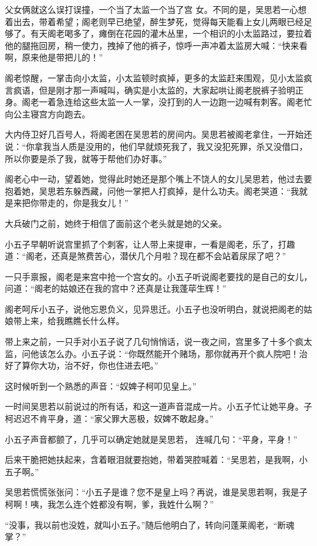 父女俩就这么误打误撞，一个当了太监一个当了宫
女。不同的是，吴思若一心想着出去，带着希望；阁老则早已绝望，醉生梦死，觉得每天能看上女儿两眼已经足够了。有天阁老喝多了，瘫倒在花园的灌木丛里，一个相识的小太监路过，要拉着他的腿拖回房，稍一使力，拽掉了他的裤子，惊呼一声冲着太监房大喊：“快来看啊，原来他是带把儿的！”

阁老惊醒，一掌击向小太监，小太监顿时疯掉，更多的太监赶来围观，见小太监疯言疯语，但是刚才那一声喊叫，确实是小太监的，大家起哄让阁老脱裤子验明正身。阁老一着急连给这些太监一人一掌，没打到的人一边跑一边喊有刺客。阁老忙向公主寝宫方向跑去。

大内侍卫好几百号人，将阁老困在吴思若的房间内。吴思若被阁老拿住，一开始还说：“你拿我当人质是没用的，他们早就烦死我了，我又没犯死罪，杀又没借口，所以你要是杀了我，就等于帮他们办好事。”

阁老心中一动，望着她，觉得此时她还是那个嘴上不饶人的女儿吴思若，他过去要抱着她，吴思若东躲西藏，问他一掌把人打疯掉，是什么功夫。阁老哭道：“我就是来把你带走的，你是我女儿！”

大兵破门之前，她终于相信了面前这个老头就是她的父亲。
\newline

小五子早朝听说宫里抓了个刺客，让人带上来提审，一看是阁老，乐了，打趣道：“阁老，还真是煞费苦心，潜伏几个月啦？现在都不会站着尿尿了吧？”

一只手禀报，阁老是来宫中抢一个宫女的。小五子听说阁老要找的是自己的女儿，问道：“阁老的姑娘还在我的宫中？还真是让我蓬荜生辉！”

阁老呵斥小五子，说他忘恩负义，见异思迁。小五子也没听明白，就说把阁老的姑娘带上来，给我瞧瞧长什么样。

带上来之前，一只手对小五子说了几句悄悄话，说一夜之间，宫里多了十多个疯太监，问他该怎么办。小五子说：“你既然能开个赌场，那你就再开个疯人院吧！治好了算你大功，治不好，你也住进去吧。”

这时候听到一个熟悉的声音：“奴婢子柯叩见皇上。”

一时间吴思若以前说过的所有话，和这一道声音混成一片。小五子忙让她平身。子柯迟迟不肯平身，道：“家父罪大恶极，奴婢不敢起身。”

小五子声音都颤了，几乎可以确定她就是吴思若，
连喊几句：“平身，平身！”

后来干脆把她扶起来，含着眼泪就要抱她，带着哭腔喊着：“吴思若，是我啊，小五子啊。”

吴思若慌慌张张问：“小五子是谁？您不是皇上吗？再说，谁是吴思若啊，我是子柯啊！咦，我怎么连个姓都没有啊，爹，我姓什么啊？”

“没事，我以前也没姓，就叫小五子。”随后他明白了，转向问蓬莱阁老，“断魂掌？”

